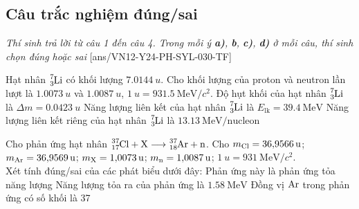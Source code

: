 \subsection{Câu trắc nghiệm đúng/sai}
\textit{Thí sinh trả lời từ câu 1 đến câu 4. Trong mỗi ý \textbf{a)}, \textbf{b}, \textbf{c)}, \textbf{d)} ở mỗi câu, thí sinh chọn đúng hoặc sai}
\setcounter{ex}{0}
[ans/VN12-Y24-PH-SYL-030-TF]
\begin{ex}
	Hạt nhân $\ce{^7_3Li}$ có khối lượng $\SI{7.0144}{u}$. Cho khối lượng của proton và neutron lần lượt là $\SI{1.0073}{u}$ và $\SI{1.0087}{u}$, $\SI{1}{u}=\SI{931.5}{\mega\electronvolt/c^2}$.
	{\True Độ hụt khối của hạt nhân $\ce{^7_3Li}$ là $\Delta m=\SI{0.0423}{u}$}
	{\True Năng lượng liên kết của hạt nhân $\ce{^7_3Li}$ là $E_{\text{lk}}=\SI{39.4}{\mega\electronvolt}$}
	{Năng lượng liên kết riêng của hạt nhân $\ce{^7_3Li}$ là $\SI{13.13}{\mega\electronvolt/\text{nucleon}}$}
	\loigiai{}
\end{ex}
\begin{ex}
	Cho phản ứng hạt nhân $\ce{^{37}_{17}Cl}+\ce{X}\longrightarrow\ce{^{37}_{18}Ar}+\ce{n}$. Cho $m_{\ce{Cl}}=\SI{36.9566}{u}$; $m_{\ce{Ar}}=\SI{36.9569}{u}$; $m_{\ce{X}}=\SI{1.0073}{u}$; $m_{\ce{n}}=\SI{1.0087}{u}$; $\SI{1}{u}=\SI{931}{\mega\electronvolt/c^2}$.\\
	Xét tính đúng/sai của các phát biểu dưới đây: 
	{Phản ứng này là phản ứng tỏa năng lượng}
	{Năng lượng tỏa ra của phản ứng là $\SI{1.58}{\mega\electronvolt}$}
	{\True Đồng vị $\ce{Ar}$ trong phản ứng có số khối là 37}
	\loigiai{}
\end{ex}
